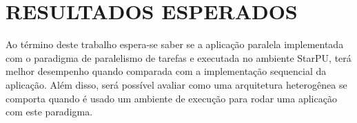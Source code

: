 
\chapter{RESULTADOS ESPERADOS}
\label{chap:resultados-esperados}

Ao término deste trabalho espera-se saber se a aplicação paralela implementada com o paradigma de paralelismo de tarefas e executada no ambiente StarPU, terá melhor desempenho quando comparada com a implementação sequencial da aplicação. Além disso, será possível avaliar como uma arquitetura heterogênea se comporta quando é usado um ambiente de execução para rodar uma aplicação com este paradigma.

